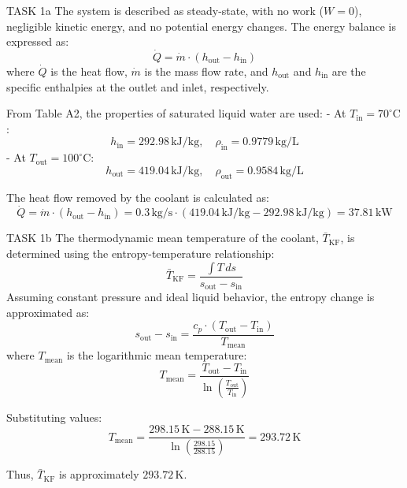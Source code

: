 TASK 1a  
The system is described as steady-state, with no work (\( W = 0 \)), negligible kinetic energy, and no potential energy changes. The energy balance is expressed as:  
\[
\dot{Q} = \dot{m} \cdot (h_{\text{out}} - h_{\text{in}})
\]  
where \( \dot{Q} \) is the heat flow, \( \dot{m} \) is the mass flow rate, and \( h_{\text{out}} \) and \( h_{\text{in}} \) are the specific enthalpies at the outlet and inlet, respectively.  

From Table A2, the properties of saturated liquid water are used:  
- At \( T_{\text{in}} = 70^\circ\text{C} \):  
  \[
  h_{\text{in}} = 292.98 \, \text{kJ/kg}, \quad \rho_{\text{in}} = 0.9779 \, \text{kg/L}
  \]  
- At \( T_{\text{out}} = 100^\circ\text{C} \):  
  \[
  h_{\text{out}} = 419.04 \, \text{kJ/kg}, \quad \rho_{\text{out}} = 0.9584 \, \text{kg/L}
  \]  

The heat flow removed by the coolant is calculated as:  
\[
\dot{Q} = \dot{m} \cdot (h_{\text{out}} - h_{\text{in}}) = 0.3 \, \text{kg/s} \cdot (419.04 \, \text{kJ/kg} - 292.98 \, \text{kJ/kg}) = 37.81 \, \text{kW}
\]  

TASK 1b  
The thermodynamic mean temperature of the coolant, \( \bar{T}_{\text{KF}} \), is determined using the entropy-temperature relationship:  
\[
\bar{T}_{\text{KF}} = \frac{\int T \, ds}{s_{\text{out}} - s_{\text{in}}}
\]  
Assuming constant pressure and ideal liquid behavior, the entropy change is approximated as:  
\[
s_{\text{out}} - s_{\text{in}} = \frac{c_p \cdot (T_{\text{out}} - T_{\text{in}})}{T_{\text{mean}}}
\]  
where \( T_{\text{mean}} \) is the logarithmic mean temperature:  
\[
T_{\text{mean}} = \frac{T_{\text{out}} - T_{\text{in}}}{\ln\left(\frac{T_{\text{out}}}{T_{\text{in}}}\right)}
\]  

Substituting values:  
\[
T_{\text{mean}} = \frac{298.15 \, \text{K} - 288.15 \, \text{K}}{\ln\left(\frac{298.15}{288.15}\right)} = 293.72 \, \text{K}
\]  

Thus, \( \bar{T}_{\text{KF}} \) is approximately \( 293.72 \, \text{K} \).